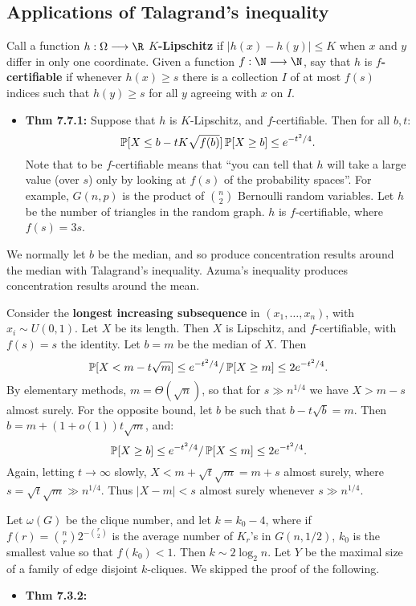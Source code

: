 \documentclass[11pt]{article}
\newenvironment{INT}[1][]{\begin{itemize}\small\item\textbf{#1}}{\end{itemize}}
\begin{document}
\begin{chapter7}
\subsection*{Applications of Talagrand's inequality}
Call a function $h:\Omega\to\R$ \textbf{$K$-Lipschitz} if $|h(x)-h(y)|\leq K$ when $x$ and $y$ differ in only one coordinate. Given a function $f:\N\to\N$, say that $h$ is \textbf{$f$-certifiable} if whenever $h(x)\geq s$ there is a collection $I$ of at most $f(s)$ indices such that $h(y)\geq s$ for all $y$ agreeing with $x$ on $I$.
\begin{INT}[Thm 7.7.1:]
Suppose that $h$ is $K$-Lipschitz, and $f$-certifiable. Then for all $b,t$:
\[\operatorname{\mathbb{P}}[X\leq b-tK\sqrt{f(b)}]\operatorname{\mathbb{P}}[X\geq b]\leq e^{-t^2/4}.\]
Note that to be $f$-certifiable means that ``you can tell that $h$ will take a large value (over $s$) only by looking at $f(s)$ of the probability spaces''. For example, $G(n,p)$ is the product of ${n\choose2}$ Bernoulli random variables. Let $h$ be the number of triangles in the random graph. $h$ is $f$-certifiable, where $f(s)=3s$.
\end{INT}
We normally let $b$ be the median, and so produce concentration results around the median with Talagrand's inequality. Azuma's inequality produces concentration results around the mean.
\begin{itemise}
\item Consider the \textbf{longest increasing subsequence} in $(x_1,\ldots,x_n)$, with $x_i\sim U(0,1)$. Let $X$ be its length. Then $X$ is Lipschitz, and $f$-certifiable, with $f(s)=s$ the identity. Let $b=m$ be the median of $X$. Then
\[\operatorname{\mathbb{P}}[X<m-t\sqrt m]\leq e^{-t^2/4}/\operatorname{\mathbb{P}}[X\geq m]\leq 2e^{-t^2/4}.\]
By elementary methods, $m=\Theta(\sqrt n)$, so that for $s\gg n^{1/4}$ we have $X>m-s$ almost surely. For the opposite bound, let $b$ be such that $b-t\sqrt b=m$. Then $b=m+(1+o(1))t\sqrt m$, and:
\[\operatorname{\mathbb{P}}[X\geq b]\leq e^{-t^2/4}/\operatorname{\mathbb{P}}[X\leq m]\leq 2e^{-t^2/4}.\]
Again, letting $t\rightarrow\infty$ slowly, $X<m+\sqrt t\sqrt m=m+s$ almost surely, where $s=\sqrt t\sqrt m \gg n^{1/4}$. Thus $|X-m|<s$ almost surely whenever $s\gg n^{1/4}$.
\item  Let $\omega(G)$ be the clique number, and let $k=k_0-4$, where if $f(r)={n\choose r}2^{-{r\choose2}}$ is the average number of $K_r$'s in $G(n,1/2)$, $k_0$ is the smallest value so that $f(k_0)<1$. Then $k\sim 2\log_2n$. Let $Y$ be the maximal size of a family of edge disjoint $k$-cliques. We skipped the proof of the following.
\begin{INT}[Thm 7.3.2:]

\end{INT}
\end{itemise}
\end{chapter7}
\end{document}

